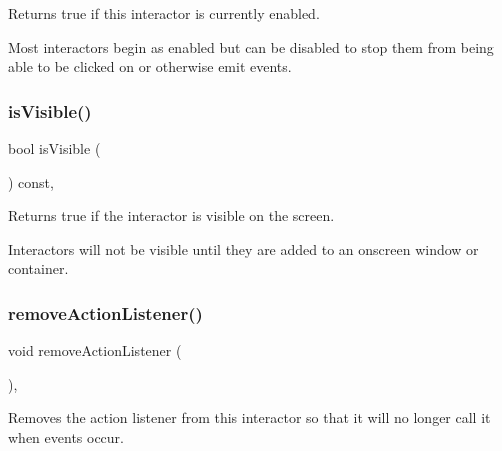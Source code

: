 Returns true if this interactor is currently enabled. 

Most interactors begin as enabled but can be disabled to stop them from being able to be clicked on or otherwise emit events. \mbox{\label{classGInteractor_a9d8a6cfb13917785c143e74d40e4e2be}} 
\subsubsection{\texorpdfstring{is\+Visible()}{isVisible()}}
{\footnotesize\ttfamily bool is\+Visible (\begin{DoxyParamCaption}{ }\end{DoxyParamCaption}) const\hspace{0.3cm}{\ttfamily [virtual]}, {\ttfamily [inherited]}}



Returns true if the interactor is visible on the screen. 

Interactors will not be visible until they are added to an onscreen window or container. \mbox{\label{classGInteractor_ab7fe7a876367b87cf7202f947f1d05e4}} 
\subsubsection{\texorpdfstring{remove\+Action\+Listener()}{removeActionListener()}}
{\footnotesize\ttfamily void remove\+Action\+Listener (\begin{DoxyParamCaption}{ }\end{DoxyParamCaption})\hspace{0.3cm}{\ttfamily [virtual]}, {\ttfamily [inherited]}}



Removes the action listener from this interactor so that it will no longer call it when events occur. 

\mbox{\label{classGInteractor_ad39d0325cde6b97ebda4b9d7787c633b}} 

